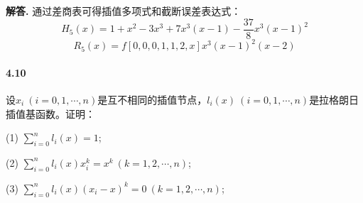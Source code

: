 \documentclass[12pt, a4paper, oneside]{ctexart}
\newenvironment{solution}{\par\noindent\textbf{解答. }}{\bigskip\par}
\begin{document}
\begin{solution}
    通过差商表可得插值多项式和截断误差表达式：
    \begin{equation*}
        H_5(x)=1+x^2-3x^3+7x^3(x-1)-\frac{37}{8}x^3(x-1)^2
    \end{equation*}
    \begin{equation*}
        R_5(x)=f[0,0,0,1,1,2,x]x^3(x-1)^2(x-2)
    \end{equation*}
\end{solution}
\paragraph{4.10}设$x_i\ (i=0,1,\cdots, n)$是互不相同的插值节点，$l_i(x)\ (i = 0, 1,\cdots, n)$是拉格朗日插值基函数。证明：

(1) $\sum\limits_{i=0}^nl_i(x)=1$;

(2) $\sum\limits_{i=0}^nl_i(x)x_i^k=x^k\ (k=1,2,\cdots, n)$;

(3) $\sum\limits_{i=0}^nl_i(x)(x_i-x)^k=0\ (k=1,2,\cdots, n)$;
\end{document}
